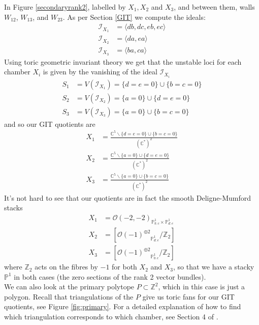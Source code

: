 \documentclass[oneside,reqno]{amsart}
\theoremstyle{definition}
\theoremstyle{definition}
\theoremstyle{definition}
\theoremstyle{definition}
\newcommand{\CC}{\mathbb{C}}
\newcommand{\PP}{\mathbb{P}}
\newcommand{\Z}{\mathbb{Z}}
\begin{document}
\newline
In Figure \ref{secondaryrank2}, labelled by $X_1, X_2$ and $X_3$, and between them, walls $W_{12}$, $W_{13}$, and $W_{23}$. As per Section \ref{GIT} we compute the ideals:
\begin{align*}
    \mathcal{I}_{X_1} &= \langle db, dc, eb, ec \rangle \\
    \mathcal{I}_{X_2} &= \langle da, ea \rangle \\
    \mathcal{I}_{X_3} &= \langle ba, ca \rangle
\end{align*}
Using toric geometric invariant theory we get that the unstable loci for each chamber $X_i$ is given by the vanishing of the ideal $ \mathcal{I}_{X_i}$
\begin{align*}
    S_1 &= V(\mathcal{I}_{X_1}) = \{  d= e= 0\} \cup \{ b=c=0\} \\
    S_2 &= V(\mathcal{I}_{X_2}) = \{ a= 0 \} \cup \{ d = e= 0\} \\
    S_3 &= V(\mathcal{I}_{X_3}) = \{ a= 0 \} \cup \{  b= c= 0\}
\end{align*}
and so our GIT quotients are
\begin{align*}
    X_1 &= \frac{\CC^5 \backslash \{  d= e= 0\} \cup \{ b=c=0\} }{ (\CC^*)^2}\\
    X_2 &= \frac{\CC^5 \backslash \{  a= 0\} \cup \{ d = e= 0\} }{ (\CC^*)^2} \\
    X_3 &= \frac{\CC^5 \backslash \{ a= 0 \} \cup \{  b= c= 0\} }{ (\CC^*)^2}
\end{align*}
It's not hard to see that our quotients are in fact the smooth Deligne-Mumford stacks
\begin{align*}
    X_1 &= {\mathcal{O} (-2, -2)}_{\PP^1_{b:c} \times \PP^1_{d:e}} \\
    X_2 &= \left[{\mathcal{O}(-1)^{\oplus 2}}_{\PP^1_{d:e}} / \Z_2 \right] \\
    X_3 &= \left[{\mathcal{O}(-1)^{\oplus 2}}_{\PP^1_{b:c}} / \Z_2 \right]
\end{align*}
where $\Z_2$ acts on the fibres by $-1$ for both $X_2$ and $X_3$, so that we have a stacky $\PP^1$ in both cases (the zero sections of the rank 2 vector bundles). \\
\newline
\noindent
We can also look at the primary polytope $P \subset \Z^2$, which in this case is just a polygon. Recall that triangulations of the $P$ give us toric fans for our GIT quotients, see Figure \ref{fig:primary}. For a detailed explanation of how to find which triangulation corresponds to which chamber, see Section 4 of \cite{coates2018crepant}.
\end{document}
